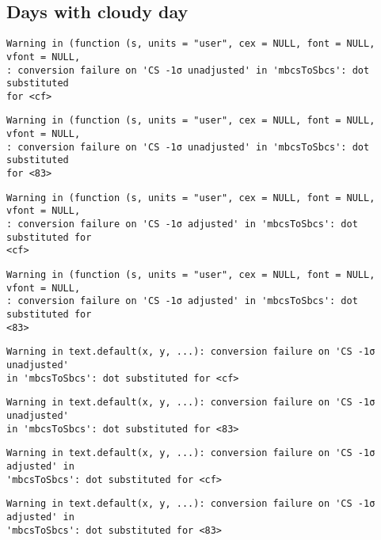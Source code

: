 \documentclass[
  10pt,
  a4paper,oneside]{article}
\begin{document}
\FloatBarrier

\hypertarget{days-with-cloudy-day}{%
\subsection{Days with cloudy day}\label{days-with-cloudy-day}}

\begin{verbatim}
Warning in (function (s, units = "user", cex = NULL, font = NULL, vfont = NULL,
: conversion failure on 'CS -1σ unadjusted' in 'mbcsToSbcs': dot substituted
for <cf>
\end{verbatim}

\begin{verbatim}
Warning in (function (s, units = "user", cex = NULL, font = NULL, vfont = NULL,
: conversion failure on 'CS -1σ unadjusted' in 'mbcsToSbcs': dot substituted
for <83>
\end{verbatim}

\begin{verbatim}
Warning in (function (s, units = "user", cex = NULL, font = NULL, vfont = NULL,
: conversion failure on 'CS -1σ adjusted' in 'mbcsToSbcs': dot substituted for
<cf>
\end{verbatim}

\begin{verbatim}
Warning in (function (s, units = "user", cex = NULL, font = NULL, vfont = NULL,
: conversion failure on 'CS -1σ adjusted' in 'mbcsToSbcs': dot substituted for
<83>
\end{verbatim}

\begin{verbatim}
Warning in text.default(x, y, ...): conversion failure on 'CS -1σ unadjusted'
in 'mbcsToSbcs': dot substituted for <cf>
\end{verbatim}

\begin{verbatim}
Warning in text.default(x, y, ...): conversion failure on 'CS -1σ unadjusted'
in 'mbcsToSbcs': dot substituted for <83>
\end{verbatim}

\begin{verbatim}
Warning in text.default(x, y, ...): conversion failure on 'CS -1σ adjusted' in
'mbcsToSbcs': dot substituted for <cf>
\end{verbatim}

\begin{verbatim}
Warning in text.default(x, y, ...): conversion failure on 'CS -1σ adjusted' in
'mbcsToSbcs': dot substituted for <83>
\end{verbatim}
\end{document}
